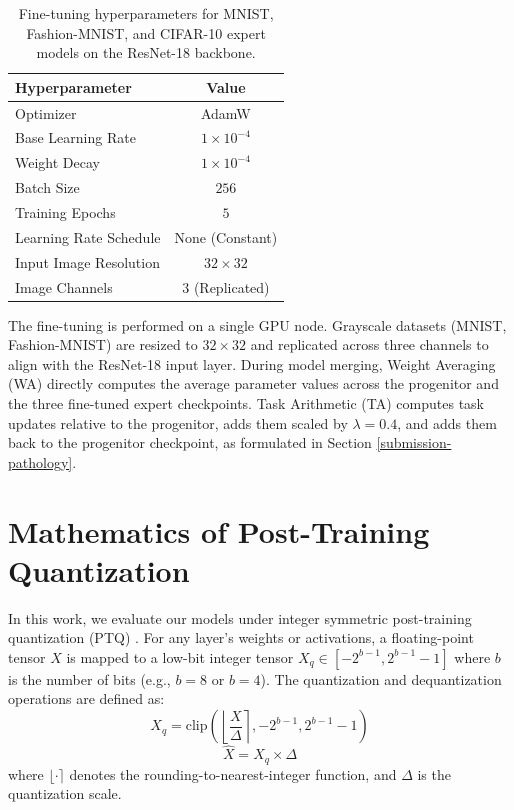 \documentclass{article}
\begin{document}
\begin{table}[h]
\caption{Fine-tuning hyperparameters for MNIST, Fashion-MNIST, and CIFAR-10 expert models on the ResNet-18 backbone.}
\label{hyperparameter-table}
\vskip 0.15in
\begin{center}
\begin{small}
\begin{sc}
\begin{tabular}{lc}
\toprule
Hyperparameter & Value \\
\midrule
Optimizer & AdamW \\
Base Learning Rate & $1 \times 10^{-4}$ \\
Weight Decay & $1 \times 10^{-4}$ \\
Batch Size & $256$ \\
Training Epochs & $5$ \\
Learning Rate Schedule & None (Constant) \\
Input Image Resolution & $32 \times 32$ \\
Image Channels & $3$ (Replicated) \\
\bottomrule
\end{tabular}
\end{sc}
\end{small}
\end{center}
\vskip -0.1in
\end{table}

The fine-tuning is performed on a single GPU node. Grayscale datasets (MNIST, Fashion-MNIST) are resized to $32 \times 32$ and replicated across three channels to align with the ResNet-18 input layer. During model merging, Weight Averaging (WA) directly computes the average parameter values across the progenitor and the three fine-tuned expert checkpoints. Task Arithmetic (TA) computes task updates relative to the progenitor, adds them scaled by $\lambda = 0.4$, and adds them back to the progenitor checkpoint, as formulated in Section \ref{submission-pathology}.

\section{Mathematics of Post-Training Quantization}
In this work, we evaluate our models under integer symmetric post-training quantization (PTQ) \cite{gholami21}. For any layer's weights or activations, a floating-point tensor $X$ is mapped to a low-bit integer tensor $X_q \in [-2^{b-1}, 2^{b-1} - 1]$ where $b$ is the number of bits (e.g., $b=8$ or $b=4$). The quantization and dequantization operations are defined as:
\begin{equation}
    X_q = \text{clip}\left(\left\lfloor \frac{X}{\Delta} \right\rceil, -2^{b-1}, 2^{b-1} - 1\right)
\end{equation}
\begin{equation}
    \hat{X} = X_q \times \Delta
\end{equation}
where $\lfloor \cdot \rceil$ denotes the rounding-to-nearest-integer function, and $\Delta$ is the quantization scale.
\end{document}
